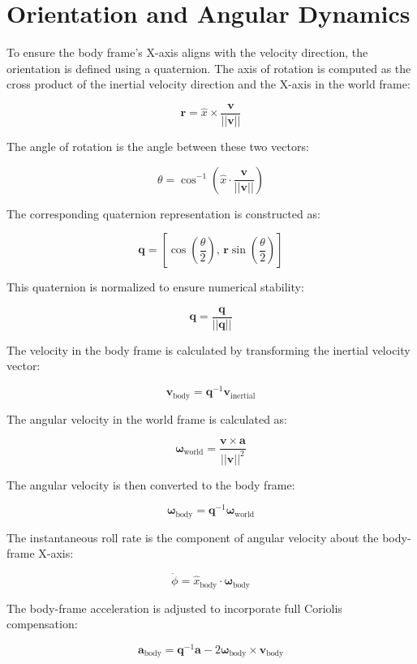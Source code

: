 \documentclass{article}
\begin{document}
	\section{Orientation and Angular Dynamics}

	To ensure the body frame’s X-axis aligns with the velocity direction, the orientation is defined using a quaternion. The axis of rotation is computed as the cross product of the inertial velocity direction and the X-axis in the world frame:

	\[
	\mathbf{r} = \hat{x} \times \frac{\mathbf{v}}{||\mathbf{v}||}
	\]

	The angle of rotation is the angle between these two vectors:

	\[
	\theta = \cos^{-1}\left( \hat{x} \cdot \frac{\mathbf{v}}{||\mathbf{v}||} \right)
	\]

	The corresponding quaternion representation is constructed as:

	\[
	\mathbf{q} = \left[\cos\left(\frac{\theta}{2}\right),\, \mathbf{r} \sin\left(\frac{\theta}{2}\right)\right]
	\]

	This quaternion is normalized to ensure numerical stability:

	\[
	\mathbf{q} = \frac{\mathbf{q}}{||\mathbf{q}||}
	\]

	The velocity in the body frame is calculated by transforming the inertial velocity vector:

	\[
	\mathbf{v}_{\text{body}} = \mathbf{q}^{-1} \mathbf{v}_{\text{inertial}}
	\]

	The angular velocity in the world frame is calculated as:

	\[
	\boldsymbol{\omega}_{\text{world}} = \frac{\mathbf{v} \times \mathbf{a}}{||\mathbf{v}||^2}
	\]

	The angular velocity is then converted to the body frame:

	\[
	\boldsymbol{\omega}_{\text{body}} = \mathbf{q}^{-1} \boldsymbol{\omega}_{\text{world}}
	\]

	The instantaneous roll rate is the component of angular velocity about the body-frame X-axis:

	\[
	\dot{\phi} = \hat{x}_{\text{body}} \cdot \boldsymbol{\omega}_{\text{body}}
	\]

	The body-frame acceleration is adjusted to incorporate full Coriolis compensation:

	\[
	\mathbf{a}_{\text{body}} = \mathbf{q}^{-1} \mathbf{a} - 2 \boldsymbol{\omega}_{\text{body}} \times \mathbf{v}_{\text{body}}
	\]
\end{document}
